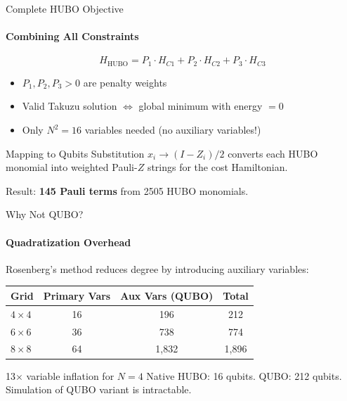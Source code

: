 \documentclass[aspectratio=169, t]{beamer}
\begin{document}
\begin{frame}{Complete HUBO Objective}
\framesubtitle{Combining All Constraints}

\begin{equation*}
    H_{\text{HUBO}} = P_1 \cdot H_{C1} + P_2 \cdot H_{C2} + P_3 \cdot H_{C3}
\end{equation*}

\bigskip
\begin{itemize}
    \item $P_1, P_2, P_3 > 0$ are penalty weights
    \item Valid Takuzu solution $\Leftrightarrow$ global minimum with energy $= 0$
    \item Only $N^2 = 16$ variables needed (no auxiliary variables!)
\end{itemize}

\bigskip
\begin{block}{Mapping to Qubits}
Substitution $x_i \rightarrow (I - Z_i)/2$ converts each HUBO monomial into weighted Pauli-$Z$ strings for the cost Hamiltonian.

\medskip
Result: \textbf{145 Pauli terms} from 2505 HUBO monomials.
\end{block}
\end{frame}

\begin{frame}{Why Not QUBO?}
\framesubtitle{Quadratization Overhead}

Rosenberg's method \cite{rosenberg1975reduction} reduces degree by introducing auxiliary variables:

\bigskip
\begin{table}
\centering
\begin{tabular}{@{} lccc @{}}
    \toprule
    Grid & Primary Vars & Aux Vars (QUBO) & Total \\
    \midrule
    $4\times4$ & 16 & 196 & 212 \\
    $6\times6$ & 36 & 738 & 774 \\
    $8\times8$ & 64 & 1,832 & 1,896 \\
    \bottomrule
\end{tabular}
\end{table}

\bigskip
\begin{alertblock}{13$\times$ variable inflation for $N=4$}
Native HUBO: 16 qubits. QUBO: 212 qubits. Simulation of QUBO variant is intractable.
\end{alertblock}
\end{frame}
\end{document}
